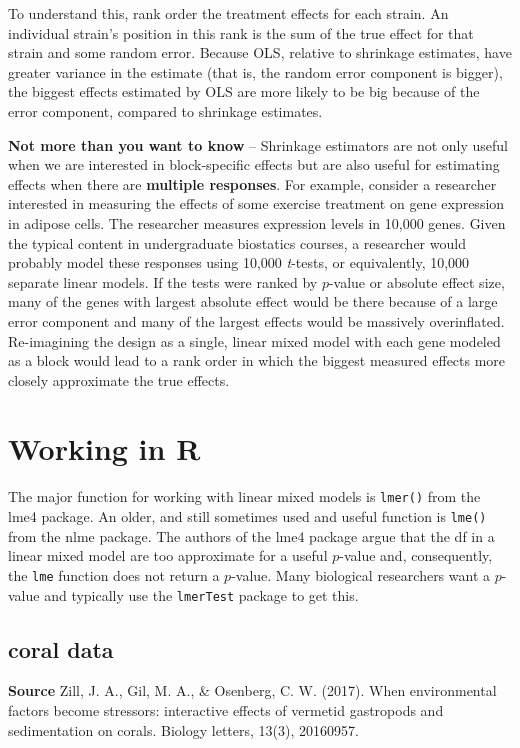 \documentclass[]{book}
\begin{document}
To understand this, rank order the treatment effects for each strain. An
individual strain's position in this rank is the sum of the true effect
for that strain and some random error. Because OLS, relative to
shrinkage estimates, have greater variance in the estimate (that is, the
random error component is bigger), the biggest effects estimated by OLS
are more likely to be big because of the error component, compared to
shrinkage estimates.

\textbf{Not more than you want to know} -- Shrinkage estimators are not
only useful when we are interested in block-specific effects but are
also useful for estimating effects when there are \textbf{multiple
responses}. For example, consider a researcher interested in measuring
the effects of some exercise treatment on gene expression in adipose
cells. The researcher measures expression levels in 10,000 genes. Given
the typical content in undergraduate biostatics courses, a researcher
would probably model these responses using 10,000 \emph{t}-tests, or
equivalently, 10,000 separate linear models. If the tests were ranked by
\(p\)-value or absolute effect size, many of the genes with largest
absolute effect would be there because of a large error component and
many of the largest effects would be massively overinflated.
Re-imagining the design as a single, linear mixed model with each gene
modeled as a block would lead to a rank order in which the biggest
measured effects more closely approximate the true effects.

\section{Working in R}\label{working-in-r-6}

The major function for working with linear mixed models is
\texttt{lmer()} from the lme4 package. An older, and still sometimes
used and useful function is \texttt{lme()} from the nlme package. The
authors of the lme4 package argue that the df in a linear mixed model
are too approximate for a useful \(p\)-value and, consequently, the
\texttt{lme} function does not return a \(p\)-value. Many biological
researchers want a \(p\)-value and typically use the \texttt{lmerTest}
package to get this.

\subsection{coral data}\label{coral-data}

\textbf{Source} Zill, J. A., Gil, M. A., \& Osenberg, C. W. (2017). When
environmental factors become stressors: interactive effects of vermetid
gastropods and sedimentation on corals. Biology letters, 13(3),
20160957.
\end{document}
